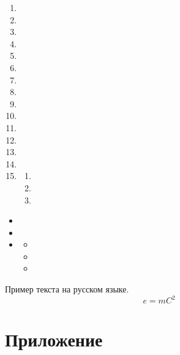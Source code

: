 \documentclass[xelatex]{G7-32-2017}
\begin{document}
\lipsum[1][1]
\begin{enumerate}
    \item \lipsum[1][1-2]
    \item \lipsum[1][3-4]
    \item \lipsum[1][5-6]
    \item \lipsum[1][1-2]
    \item \lipsum[1][3-4]
    \item \lipsum[1][5-6]
    \item \lipsum[1][1-2]
    \item \lipsum[1][3-4]
    \item \lipsum[1][5-6]
    \item \lipsum[1][1-2]
    \item \lipsum[1][3-4]
    \item \lipsum[1][5-6]
    \item \lipsum[1][1-2]
    \item \lipsum[1][3-4]
    \item \lipsum[1][5-6]
    \begin{enumerate}
        \item \lipsum[2][1-3]
        \item \lipsum[2][2]
        \item \lipsum[2][3]
    \end{enumerate}
\end{enumerate}
\begin{itemize}
    \item \lipsum[1][1-2]
    \item \lipsum[1][3-4]
    \item \lipsum[1][5-6]
    \begin{itemize}
        \item \lipsum[2][1-3]
        \item \lipsum[2][2]
        \item \lipsum[2][3]
    \end{itemize}
\end{itemize}

Пример текста на русском языке.
\begin{equation}
    \label{ex:eq:1}
    e = mC^2
\end{equation}

\backmatter

\Conclusion

\lipsum[1-5]

\appenmatter
\appendix

\chapter{Приложение}
\end{document}
